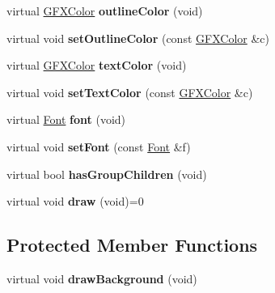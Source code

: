 \begin{DoxyCompactItemize}
\item 
virtual \hyperlink{structGFXColor}{G\+F\+X\+Color} {\bfseries outline\+Color} (void)\hypertarget{classControl_adcd9ce32d0a972dfd00cf6c5c27499a8}{}\label{classControl_adcd9ce32d0a972dfd00cf6c5c27499a8}

\item 
virtual void {\bfseries set\+Outline\+Color} (const \hyperlink{structGFXColor}{G\+F\+X\+Color} \&c)\hypertarget{classControl_ab821918402316596740cd0ad050322f3}{}\label{classControl_ab821918402316596740cd0ad050322f3}

\item 
virtual \hyperlink{structGFXColor}{G\+F\+X\+Color} {\bfseries text\+Color} (void)\hypertarget{classControl_ab43ee966231a42d175e3bc75e6602776}{}\label{classControl_ab43ee966231a42d175e3bc75e6602776}

\item 
virtual void {\bfseries set\+Text\+Color} (const \hyperlink{structGFXColor}{G\+F\+X\+Color} \&c)\hypertarget{classControl_a8291a4bed2c7d3a946cbc6a4f42d7fc2}{}\label{classControl_a8291a4bed2c7d3a946cbc6a4f42d7fc2}

\item 
virtual \hyperlink{classFont}{Font} {\bfseries font} (void)\hypertarget{classControl_a9ffe79e4fc6e2fa2c5621f3c4bb74f5b}{}\label{classControl_a9ffe79e4fc6e2fa2c5621f3c4bb74f5b}

\item 
virtual void {\bfseries set\+Font} (const \hyperlink{classFont}{Font} \&f)\hypertarget{classControl_ad16bd326ce7a1641a44e6b3408192573}{}\label{classControl_ad16bd326ce7a1641a44e6b3408192573}

\item 
virtual bool {\bfseries has\+Group\+Children} (void)\hypertarget{classControl_ad877ade9b9004ec6681e9b57adae75d2}{}\label{classControl_ad877ade9b9004ec6681e9b57adae75d2}

\item 
virtual void {\bfseries draw} (void)=0\hypertarget{classControl_a829cbf6ac6876b17801743ed05fce4d6}{}\label{classControl_a829cbf6ac6876b17801743ed05fce4d6}

\end{DoxyCompactItemize}
\subsection*{Protected Member Functions}
\begin{DoxyCompactItemize}
\item 
virtual void {\bfseries draw\+Background} (void)\hypertarget{classControl_ada09253ae2b112665339ae808b018f45}{}\label{classControl_ada09253ae2b112665339ae808b018f45}

\end{DoxyCompactItemize}
